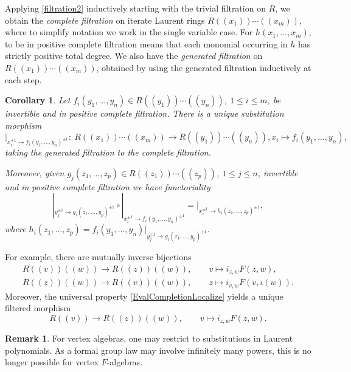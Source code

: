 \documentclass[10pt,a4paper]{amsart}
\numberwithin{equation}{section}
\newtheorem{Corollary}[Theorem]{Corollary}
\theoremstyle{definition}
\newtheorem{Remark}[Theorem]{Remark}
\begin{document}
Applying \eqref{filtration2} inductively starting with the trivial filtration on $R$, we obtain the \emph{complete filtration} on iterate Laurent rings $R(\!( x_1)\!)\cdots(\!( x_m)\!)$, where to simplify notation we work in the single variable case. For $h(x_1,\dots, x_m)$, to be in positive complete filtration means that each monomial occurring in $h$ has strictly positive total degree. We also have the \emph{generated filtration} on $R(\!( x_1)\!)\cdots(\!( x_m)\!)$, obtained by using the generated filtration inductively at each step.

\begin{Corollary}
Let $f_i(y_1,\dots,y_n)\in R(\!( y_1)\!)\cdots(\!( y_n)\!)$, $1\leqslant i\leqslant m$, be invertible and in positive complete filtration. There is a unique \emph{substitution morphism}{\samepage
\[
 |_{x_i^{\pm1}\to f_i(y_1,\dots,y_n)^{\pm1}}\colon\ R(\!( x_1)\!)\cdots(\!( x_m)\!)\longrightarrow R(\!( y_1)\!)\cdots(\!( y_n)\!), x_i\longmapsto f_i(y_1,\dots,y_n),
\]
taking the generated filtration to the complete filtration.}

Moreover, given $g_j(z_1,\dots, z_p)\in R(\!( z_1)\!)\cdots(\!( z_p)\!)$, $1\leqslant j\leqslant n$, invertible and in positive complete filtration we have \emph{functoriality}
\[
 |_{y_j^{\pm1}\to g_i(z_1,\dots,y_p)^{\pm1}} \circ |_{x_i^{\pm1}\to f_i(y_1,\dots,y_n)^{\pm1}}=|_{x_i^{\pm1}\to h_i(z_1,\dots, z_p)^{\pm1}},
\]
where $h_i(z_1,\dots, z_p)=f_i(y_1,\dots,y_n)|_{y_j^{\pm1}\to g_i(z_1,\dots,y_p)^{\pm1}}$.
\end{Corollary}

For example, there are mutually inverse bijections
\begin{gather}
 R(\!( v)\!)(\!( w)\!)\longrightarrow R(\!( z)\!)(\!( w)\!),\qquad v\longmapsto i_{z,w}F(z,w), \label{substitution1}\\
 R(\!( z)\!)(\!( w)\!)\longrightarrow R(\!( v)\!)(\!( w)\!),\qquad z\longmapsto i_{v,w}F(v,\iota(w)).\label{substitution3}
\end{gather}
Moreover, the universal property \eqref{EvalCompletionLocalize} yields a unique filtered morphism
 \begin{equation}
 \label{substitution2}
 R(\!( v)\!)\longrightarrow R(\!( z)\!)(\!( w)\!),\qquad v\longmapsto i_{z,w}F(z,w).
 \end{equation}


\begin{Remark}
 For vertex algebras, one may restrict to substitutions in Laurent polynomials. As a formal group law may involve infinitely many powers, this is no longer possible for vertex $F$-algebras.
\end{Remark}
\end{document}
